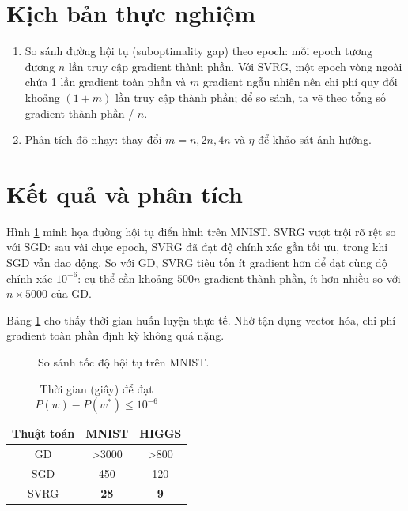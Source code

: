 \documentclass[12pt,a4paper]{report}
\theoremstyle{definition}
\begin{document}
\section{Kịch bản thực nghiệm}
\begin{enumerate}
    \item So sánh đường hội tụ (suboptimality gap) theo epoch: mỗi epoch tương đương $n$ lần truy cập gradient thành phần. Với SVRG, một epoch vòng ngoài chứa 1 lần gradient toàn phần và $m$ gradient ngẫu nhiên nên chi phí quy đổi khoảng $(1 + m)$ lần truy cập thành phần; để so sánh, ta vẽ theo tổng số gradient thành phần / $n$.
    \item Phân tích độ nhạy: thay đổi $m = n, 2n, 4n$ và $\eta$ để khảo sát ảnh hưởng.
\end{enumerate}

\section{Kết quả và phân tích}
Hình \ref{fig:main} minh họa đường hội tụ điển hình trên MNIST. SVRG vượt trội rõ rệt so với SGD: sau vài chục epoch, SVRG đã đạt độ chính xác gần tối ưu, trong khi SGD vẫn dao động. So với GD, SVRG tiêu tốn ít gradient hơn để đạt cùng độ chính xác $10^{-6}$: cụ thể cần khoảng $500n$ gradient thành phần, ít hơn nhiều so với $n \times 5000$ của GD.

Bảng \ref{tab:time} cho thấy thời gian huấn luyện thực tế. Nhờ tận dụng vector hóa, chi phí gradient toàn phần định kỳ không quá nặng.

\begin{figure}[htbp]
\centering
{}
\caption{So sánh tốc độ hội tụ trên MNIST.}
\label{fig:main}
\end{figure}

\begin{table}[htbp]
\centering
\caption{Thời gian (giây) để đạt $P(w)-P(w^*) \le 10^{-6}$}
\label{tab:time}
\begin{tabular}{|c|c|c|}
\hline
Thuật toán & MNIST & HIGGS \\ \hline
GD     & >3000 & >800 \\
SGD    & 450   & 120 \\
SVRG   & \textbf{28} & \textbf{9} \\
\hline
\end{tabular}
\end{table}
\end{document}
